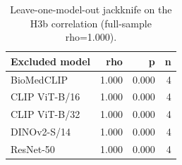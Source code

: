 \begin{table}[t]
  \centering
  \small
  \caption{Leave-one-model-out jackknife on the H3b correlation (full-sample rho=1.000).}
  \label{tab:jackknife}
  \begin{tabular}{lrrr}
    \toprule
    \textbf{Excluded model} & \textbf{rho} & \textbf{p} & \textbf{n} \\
    \midrule
    BioMedCLIP & 1.000 & 0.000 & 4 \\
    CLIP ViT-B/16 & 1.000 & 0.000 & 4 \\
    CLIP ViT-B/32 & 1.000 & 0.000 & 4 \\
    DINOv2-S/14 & 1.000 & 0.000 & 4 \\
    ResNet-50 & 1.000 & 0.000 & 4 \\
    \bottomrule
  \end{tabular}
\end{table}